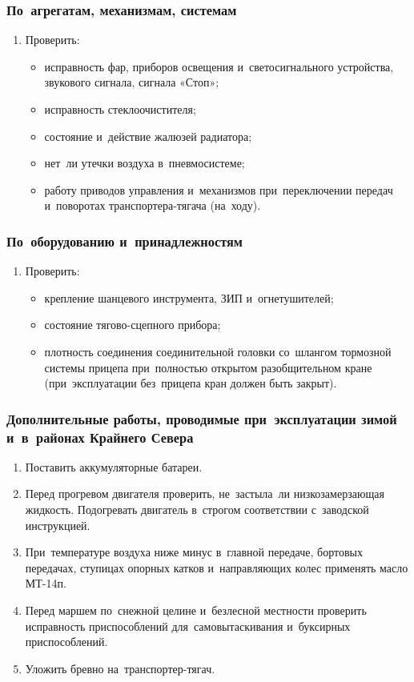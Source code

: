 \subsubsection{По~агрегатам, механизмам, системам}
\begin{enumerate}
    \item Проверить: 

\begin{itemize}
    \item исправность фар, приборов освещения и~светосигнального устройства, звукового сигнала, сигнала «Стоп»; 
    \item исправность стеклоочистителя; 
    \item состояние и~действие жалюзей радиатора; 
    \item нет~ли утечки воздуха в~пневмосистеме; 
    \item работу приводов управления и~механизмов при~переключении передач и~поворотах транспортера-тягача (на~ходу). 
\end{itemize}
\end{enumerate}


\subsubsection{По~оборудованию и~принадлежностям}
\begin{enumerate}
    \item Проверить:
    \begin{itemize}
        \item крепление шанцевого инструмента, ЗИП и~огнетушителей; 
        \item состояние тягово-сцепного прибора; 
        \item плотность соединения соединительной головки со~шлангом тормозной системы прицепа при~полностью открытом разобщительном кране (при~эксплуатации без~прицепа кран должен быть закрыт). 
    \end{itemize}
\end{enumerate}

\subsubsection{Дополнительные работы, проводимые при~эксплуатации зимой и~в~районах Крайнего Севера}

\begin{enumerate}
    \item Поставить аккумуляторные батареи. 
    \item Перед прогревом двигателя проверить, не~застыла~ли низкозамерзающая жидкость. Подогревать двигатель в~строгом соответствии с~заводской инструкцией. 
    \item При~температуре воздуха ниже минус  в~главной передаче, бортовых передачах, ступицах опорных катков и~направляющих колес применять масло МТ-14п. 
    \item Перед маршем по~снежной целине и~безлесной местности проверить исправность приспособлений для~самовытаскивания и~буксирных приспособлений. 
    \item Уложить бревно на~транспортер-тягач. 
\end{enumerate}

